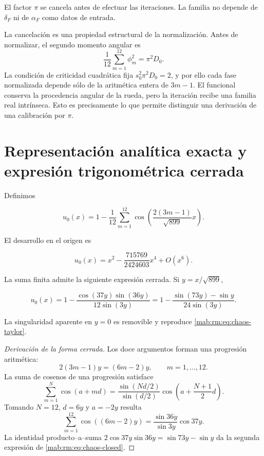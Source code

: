 El factor \(\pi\) se cancela antes de efectuar las iteraciones. La familia no
depende de \(\delta_F\) ni de \(\alpha_F\) como datos de entrada.

La cancelaci\'on es una propiedad estructural de la normalizaci\'on. Antes de
normalizar,
el segundo momento angular es
\[
\frac1{12}\sum_{m=1}^{12}\phi_m^2
=\pi^2D_0.
\]
La condici\'on de criticidad cuadr\'atica fija
\(s_0^2\pi^2D_0=2\), y por ello cada fase normalizada depende s\'olo de la
aritm\'etica entera de \(3m-1\). El funcional conserva la procedencia angular de
la rueda, pero la iteraci\'on recibe una familia real intr\'inseca. Esto es
precisamente lo que permite distinguir una derivaci\'on de una calibraci\'on
por \(\pi\).

\section{Representaci\'on anal\'itica exacta y expresi\'on trigonom\'etrica cerrada}

Definimos

\begin{equation}
u_0(x)=1-\frac1{12}\sum_{m=1}^{12}
\cos\!\left(\frac{2(3m-1)}{\sqrt{899}}x\right).
\label{mab:rm:eq:chaos-profile}
\end{equation}

El desarrollo en el origen es

\begin{equation}
u_0(x)=x^2-\frac{715769}{2424603}x^4+O(x^6).
\label{mab:rm:eq:chaos-taylor}
\end{equation}

La suma finita admite la siguiente expresi\'on cerrada. Si \(y=x/\sqrt{899}\),

\begin{equation}
u_0(x)=1-\frac{\cos(37y)\sin(36y)}{12\sin(3y)}
=1-\frac{\sin(73y)-\sin y}{24\sin(3y)}.
\label{mab:rm:eq:chaos-closed}
\end{equation}

La singularidad aparente en \(y=0\) es removible y reproduce \cref{mab:rm:eq:chaos-taylor}.

\begin{proof}[Derivaci\'on de la forma cerrada]
Los doce argumentos forman una progresi\'on aritm\'etica:
\[
2(3m-1)y=(6m-2)y,\qquad m=1,\ldots,12.
\]
La suma de cosenos de una progresi\'on satisface
\[
\sum_{m=1}^{N}\cos(a+md)
=\frac{\sin(Nd/2)}{\sin(d/2)}
 \cos\!\left(a+\frac{N+1}{2}d\right).
\]
Tomando \(N=12\), \(d=6y\) y \(a=-2y\) resulta
\[
\sum_{m=1}^{12}\cos((6m-2)y)
=\frac{\sin36y}{\sin3y}\cos37y.
\]
La identidad producto--a--suma
\(2\cos37y\sin36y=\sin73y-\sin y\) da la segunda expresi\'on de
\cref{mab:rm:eq:chaos-closed}.
\end{proof}

